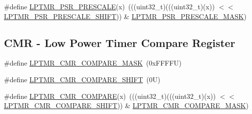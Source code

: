 \begin{DoxyCompactItemize}
\item 
\#define \mbox{\hyperlink{group___l_p_t_m_r___register___masks_ga37d8f4b0de3a75590548d8f3b6686b95}{L\+P\+T\+M\+R\+\_\+\+P\+S\+R\+\_\+\+P\+R\+E\+S\+C\+A\+LE}}(x)~(((uint32\+\_\+t)(((uint32\+\_\+t)(x)) $<$$<$ \mbox{\hyperlink{group___l_p_t_m_r___register___masks_ga7ed76902e13634d0c543ade3ef47525a}{L\+P\+T\+M\+R\+\_\+\+P\+S\+R\+\_\+\+P\+R\+E\+S\+C\+A\+L\+E\+\_\+\+S\+H\+I\+FT}})) \& \mbox{\hyperlink{group___l_p_t_m_r___register___masks_ga93a6fe3fb169a73716a837cedb92dbef}{L\+P\+T\+M\+R\+\_\+\+P\+S\+R\+\_\+\+P\+R\+E\+S\+C\+A\+L\+E\+\_\+\+M\+A\+SK}})
\end{DoxyCompactItemize}
\subsection*{C\+MR -\/ Low Power Timer Compare Register}
\begin{DoxyCompactItemize}
\item 
\#define \mbox{\hyperlink{group___l_p_t_m_r___register___masks_ga55cc95c022500b353f1724f2cbfe7a8f}{L\+P\+T\+M\+R\+\_\+\+C\+M\+R\+\_\+\+C\+O\+M\+P\+A\+R\+E\+\_\+\+M\+A\+SK}}~(0x\+F\+F\+F\+F\+U)
\item 
\#define \mbox{\hyperlink{group___l_p_t_m_r___register___masks_gae1a525e22dc8b9c6960ae2e859a64232}{L\+P\+T\+M\+R\+\_\+\+C\+M\+R\+\_\+\+C\+O\+M\+P\+A\+R\+E\+\_\+\+S\+H\+I\+FT}}~(0\+U)
\item 
\#define \mbox{\hyperlink{group___l_p_t_m_r___register___masks_gad61ee0ea43ca3e503c2c16ed1b7b1696}{L\+P\+T\+M\+R\+\_\+\+C\+M\+R\+\_\+\+C\+O\+M\+P\+A\+RE}}(x)~(((uint32\+\_\+t)(((uint32\+\_\+t)(x)) $<$$<$ \mbox{\hyperlink{group___l_p_t_m_r___register___masks_gae1a525e22dc8b9c6960ae2e859a64232}{L\+P\+T\+M\+R\+\_\+\+C\+M\+R\+\_\+\+C\+O\+M\+P\+A\+R\+E\+\_\+\+S\+H\+I\+FT}})) \& \mbox{\hyperlink{group___l_p_t_m_r___register___masks_ga55cc95c022500b353f1724f2cbfe7a8f}{L\+P\+T\+M\+R\+\_\+\+C\+M\+R\+\_\+\+C\+O\+M\+P\+A\+R\+E\+\_\+\+M\+A\+SK}})
\end{DoxyCompactItemize}
